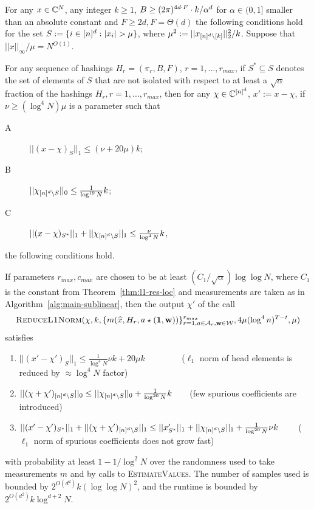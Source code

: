 \begin{lemma}\label{lm:reduce-l1-norm}
For any $x\in \mathbb{C}^N$, any integer $k\geq 1$, $B\geq (2\pi)^{4d\cdot F}\cdot k/\alpha^d$ for $\alpha\in (0, 1]$ smaller than an absolute constant and $F\geq 2d, F=\Theta(d)$ the following conditions hold for the set $S:=\{i\in \nsq: |x_i|>\mu\}$, where $\mu^2:=||x_{{[n]^d}\setminus [k]}||_2^2/k$. Suppose that $||x||_\infty/\mu=N^{O(1)}$.

For any sequence of hashings $H_r=(\pi_r, B, F)$, $r=1,\ldots, r_{max}$, if $S^*\subseteq S$ denotes the set of elements of $S$ that are not isolated with respect to at least a $\sqrt{\alpha}$ fraction of the hashings  $H_r, r=1,\ldots, r_{max}$, then for any $\chi\in \mathbb{C}^{[n]^d}$, $x':=x-\chi$, if $\nu\geq (\log^4 N)\mu$ is a parameter such that
\begin{description}
\item[A] $||(x-\chi)_S||_1\leq  (\nu +20\mu)k$;
\item[B] $||\chi_{{[n]^d}\setminus S}||_0\leq \frac{1}{\log^{19} N}k$;
\item[C] $||(x-\chi)_{S^*}||_1+||\chi_{{[n]^d}\setminus S}||_1\leq \frac{\nu}{\log^4 N}k$,
\end{description}
the following conditions hold.

If parameters $r_{max}, c_{max}$ are chosen to be at least $(C_1/\sqrt{\alpha})\log\log N$, where $C_1$ is the constant from Theorem~\ref{thm:l1-res-loc} and measurements are taken as in Algorithm~\ref{alg:main-sublinear}, then the output $\chi'$ of the call 
$$
\Call{ReduceL1Norm}{\chi, k, \{m(\wh{x}, H_r, a\star (\one, \h))\}_{r=1, a\in \A_r, \h\in \H}^{r_{max}}, 4\mu (\log^4 n)^{T-t}, \mu}
$$ 
satisfies
\begin{enumerate}
\item $||(x'-\chi')_S||_1\leq \frac1{\log^{4} N} \nu k+20\mu k$ ~~~~~~~~($\ell_1$ norm of head elements is reduced by $\approx \log^4 N$ factor)
\item $||(\chi+\chi')_{{[n]^d}\setminus S}||_0\leq ||\chi_{{[n]^d}\setminus S}||_0+ \frac1{\log^{20} N}k$~~~~(few spurious coefficients are introduced)
\item $||(x'-\chi')_{S^*}||_1+||(\chi+\chi')_{{[n]^d}\setminus S}||_1\leq ||x'_{S^*}||_1+||\chi_{{[n]^d}\setminus S}||_1+\frac1{\log^{20} N}\nu k$ ~~~~($\ell_1$ norm of spurious coefficients does not grow fast)
\end{enumerate}
with probability at least $1-1/\log^{2} N$ over the randomness used to take measurements $m$ and by calls to \textsc{EstimateValues}.
The number of samples used is bounded by $2^{O(d^2)}k(\log\log N)^2$, and the runtime is bounded by $2^{O(d^2)} k\log^{d+2} N$.
\end{lemma}


